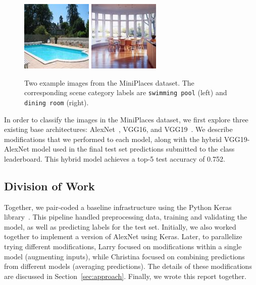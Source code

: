 \documentclass[10pt,twocolumn,letterpaper]{article}
\begin{document}
\begin{figure}[ht]
\centering
\includegraphics[width=0.49\linewidth]{imgs/swimmingpool.jpg}
\includegraphics[width=0.49\linewidth]{imgs/diningroom.jpg}
\caption{Two example images from the MiniPlaces dataset. The corresponding scene category labels are \texttt{swimming pool} (left) and \texttt{dining room} (right).}
\label{fig:dataset}
\end{figure}

In order to classify the images in the MiniPlaces dataset, we first explore three existing base architectures: AlexNet~\cite{alexnet}, VGG16, and VGG19~\cite{vgg}. We describe modifications that we performed to each model, along with the hybrid VGG19-AlexNet model used in the final test set predictions submitted to the class leaderboard. This hybrid model achieves a top-5 test accuracy of 0.752.

\subsection{Division of Work}

Together, we pair-coded a baseline infrastructure using the Python Keras library~\cite{keras}. This pipeline handled preprocessing data, training and validating the model, as well as predicting labels for the test set. Initially, we also worked together to implement a version of AlexNet using Keras. Later, to parallelize trying different modifications, Larry focused on modifications within a single model (augmenting inputs), while Christina focused on combining predictions from different models (averaging predictions). The details of these modifications are discussed in Section~\ref{sec:approach}. Finally, we wrote this report together.
\end{document}
